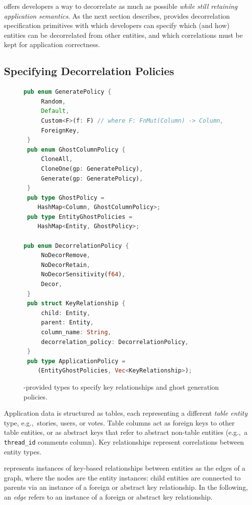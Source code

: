 \sys{} offers developers a way to decorrelate as much as possible \emph{while still retaining
application semantics}. As the next section describes, \sys{} provides decorrelation specification
primitives with which developers can specify which (and how) entities can be decorrelated from other
entities, and which correlations must be kept for application correctness.

\subsection{Specifying Decorrelation Policies}

\begin{figure}
\begin{lstlisting}[language=Rust]
 pub enum GeneratePolicy {
     Random,
     Default,
     Custom<F>(f: F) // where F: FnMut(Column) -> Column,
     ForeignKey, 
 }
 pub enum GhostColumnPolicy {
     CloneAll,
     CloneOne(gp: GeneratePolicy),
     Generate(gp: GeneratePolicy),
 }
 pub type GhostPolicy = 
    HashMap<Column, GhostColumnPolicy>;
 pub type EntityGhostPolicies = 
    HashMap<Entity, GhostPolicy>;

pub enum DecorrelationPolicy {
     NoDecorRemove,
     NoDecorRetain,
     NoDecorSensitivity(f64),
     Decor,
 }
 pub struct KeyRelationship {
     child: Entity,
     parent: Entity,
     column_name: String,
     decorrelation_policy: DecorrelationPolicy,
 }
 pub type ApplicationPolicy = 
    (EntityGhostPolicies, Vec<KeyRelationship>);
\end{lstlisting}
    \caption{\sys{}-provided types to specify key relationships and ghost generation policies.
    }
\end{figure}

Application data is structured as tables, each representing a different \emph{table entity} type,
e.g.,\ stories, users, or votes. Table columns act as foreign keys to other table entities, or as
abstract keys that refer to abstract non-table entities (e.g.,\ a \texttt{thread\_id} comments column). 
Key relationships represent correlations between entity types.

\sys{} represents instances of key-based relationships between entities as the edges of a graph,
where the nodes are the entity instances: child entities are connected to parents via an instance of
a foreign or abstract key relationship. In the following, an \emph{edge} refers to an instance of a
foreign or abstract key relationship.


